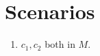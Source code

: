 \section{Scenarios}
\label{sec:scenario}

\begin{enumerate}
\item $c_1, c_2$ both in $M$.
\end{enumerate}
